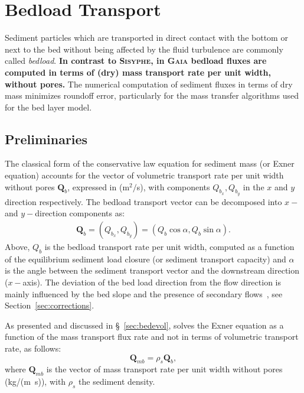 \pagebreak
\section[Bedload sediment transport]{Bedload Transport}\label{sec:BedloadTransport}
Sediment particles which are transported in direct contact with the bottom or next to the bed without being affected by the fluid turbulence are commonly called \textit{bedload}. \textbf{In contrast to \textsc{Sisyphe}, in \textsc{Gaia} bedload fluxes are computed in terms of (dry) mass transport rate per unit width, without pores.} The numerical computation of sediment fluxes in terms of dry mass minimizes roundoff error, particularly for the mass transfer algorithms used for the bed layer model.

\subsection{Preliminaries}
The classical form of the conservative law equation for sediment mass (or Exner equation) accounts for the vector of volumetric transport rate per unit width without pores $\mathbf Q_b$, expressed in (m$^2/$s), with components $Q_{b_x}, Q_{b_y}$ in the $x$ and $y$ direction respectively. The bedload transport vector can be decomposed into $x-$ and $y-$direction components as:
\begin{align}
\mathbf Q_b = (Q_{b_x}, Q_{b_y}) = (Q_b \cos\alpha, Q_b \sin\alpha).
\label{eq:bedloadtransportvector}
\end{align}
Above, $Q_b$ is the bedload transport rate per unit width, computed as a function of the equilibrium sediment load closure (or sediment transport capacity) and $\alpha$ is the angle between the sediment transport vector and the downstream direction ($x-$axis). The deviation of the bed load direction from the flow direction is mainly influenced by the bed slope and the presence of secondary flows~\cite{Talmon95}, see Section~\ref{sec:corrections}.

As presented and discussed in \S~\ref{sec:bedevol}, \gaia{} solves the Exner equation as a function of the mass transport flux rate and not in terms of volumetric transport rate, as follows:
\begin{equation}
\mathbf Q_{mb}=\rho_s \mathbf Q_b,
\end{equation}
where $\mathbf Q_{mb}$ is the vector of mass transport rate per unit width without pores (kg/(m~s)), with $\rho_s$ the sediment density.

